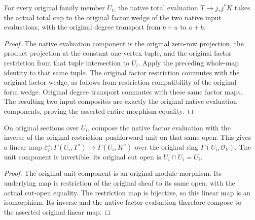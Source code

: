 \begin{theorem}
\label{thm:di-total-cup-original-factor-evaluation}
\leanok
For every original family member $U_i$, the native total evaluation
$T\to j_*j^*K$ takes the actual total cup to the original factor wedge
of the two native input evaluations, with the original degree
transport from $b+a$ to $a+b$.
\end{theorem}
\begin{proof}
\leanok
The native evaluation component is the original zero-row projection,
the product projection at the constant one-vertex tuple, and the
original factor restriction from that tuple intersection to $U_i$.
Apply the preceding whole-map identity to that same tuple. The
original factor restriction commutes with the original factor wedge,
as follows from restriction compatibility of the original form wedge.
Original degree transport commutes with these same factor maps.
The resulting two input composites are exactly the original native
evaluation components, proving the asserted entire morphism equality.
\end{proof}

\begin{definition}
\label{def:di-total-cup-original-member-section-evaluation}
\leanok
On original sections over $U_i$, compose the native factor evaluation
with the inverse of the original restriction--pushforward unit on
that same open. This gives a linear map
$\varepsilon_i^a:\Gamma(U_i,T^a)\to\Gamma(U_i,K^a)$ over the original
ring $\Gamma(U_i,\mathcal O_Y)$. The unit component is invertible:
its original cut open is $U_i\cap U_i=U_i$.
\end{definition}
\begin{proof}
\leanok
The original unit component is an original module morphism. Its
underlying map is restriction of the original sheaf to its same open,
with the actual cut-open equality. The restriction map is bijective,
so this linear map is an isomorphism. Its inverse and the native factor
evaluation therefore compose to the asserted original linear map.
\end{proof}


